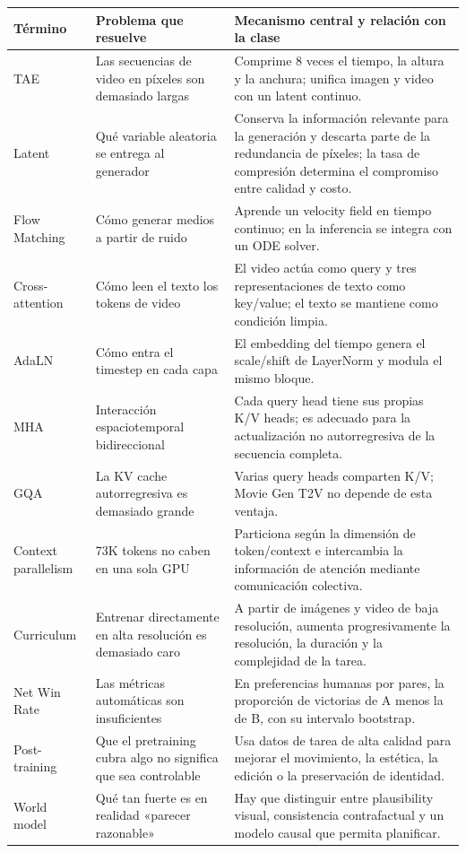 \begin{center}
\small
\begin{tabularx}{\textwidth}{p{} X X}
\toprule
\textbf{Término} & \textbf{Problema que resuelve} & \textbf{Mecanismo central y relación con la clase} \\
\midrule
TAE & Las secuencias de video en píxeles son demasiado largas & Comprime 8 veces el tiempo, la altura y la anchura; unifica imagen y video con un latent continuo. \\
Latent & Qué variable aleatoria se entrega al generador & Conserva la información relevante para la generación y descarta parte de la redundancia de píxeles; la tasa de compresión determina el compromiso entre calidad y costo. \\
Flow Matching & Cómo generar medios a partir de ruido & Aprende un velocity field en tiempo continuo; en la inferencia se integra con un ODE solver. \\
Cross-attention & Cómo leen el texto los tokens de video & El video actúa como query y tres representaciones de texto como key/value; el texto se mantiene como condición limpia. \\
AdaLN & Cómo entra el timestep en cada capa & El embedding del tiempo genera el scale/shift de LayerNorm y modula el mismo bloque. \\
MHA & Interacción espaciotemporal bidireccional & Cada query head tiene sus propias K/V heads; es adecuado para la actualización no autorregresiva de la secuencia completa. \\
GQA & La KV cache autorregresiva es demasiado grande & Varias query heads comparten K/V; Movie Gen T2V no depende de esta ventaja. \\
Context parallelism & 73K tokens no caben en una sola GPU & Particiona según la dimensión de token/context e intercambia la información de atención mediante comunicación colectiva. \\
Curriculum & Entrenar directamente en alta resolución es demasiado caro & A partir de imágenes y video de baja resolución, aumenta progresivamente la resolución, la duración y la complejidad de la tarea. \\
Net Win Rate & Las métricas automáticas son insuficientes & En preferencias humanas por pares, la proporción de victorias de A menos la de B, con su intervalo bootstrap. \\
Post-training & Que el pretraining cubra algo no significa que sea controlable & Usa datos de tarea de alta calidad para mejorar el movimiento, la estética, la edición o la preservación de identidad. \\
World model & Qué tan fuerte es en realidad «parecer razonable» & Hay que distinguir entre plausibility visual, consistencia contrafactual y un modelo causal que permita planificar. \\
\bottomrule
\end{tabularx}
\end{center}

